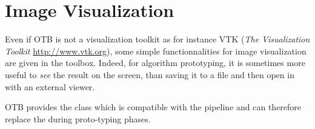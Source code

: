 \chapter{Image Visualization}
\label{chap:ImageVisualization}
Even if OTB is not a visualization toolkit as for instance VTK
(\emph{The Visualization Toolkit} \url{http://www.vtk.org}), some
simple functionnalities for image visualization are given in the
toolbox. Indeed, for algorithm prototyping, it is sometimes more
useful to \emph{see} the result on the screen, than saving it to a
file and then open in with an external viewer.

OTB provides the  class which is compatible
with the pipeline and can therefore replace the
 during proto-typing phases.



